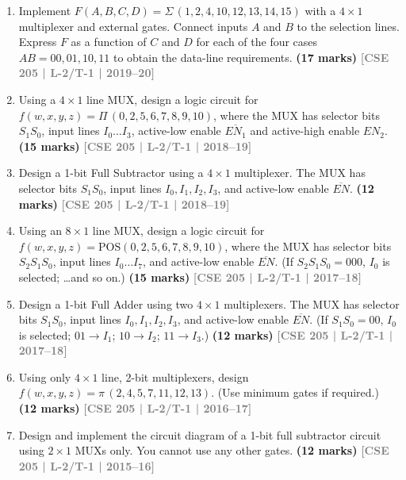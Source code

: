 \documentclass[12pt]{article}
\newcommand{\yr}[1]{\hfill\textcolor{gray}{\small\textbf{[#1]}}}
\newcommand{\mk}[1]{\textcolor{orange!70!black}{\small\textbf{(#1 marks)}}}
\begin{document}
\begin{enumerate}
\item Implement $F(A,B,C,D) = \Sigma\,(1,2,4,10,12,13,14,15)$ with a $4\times1$ multiplexer and external gates. Connect inputs $A$ and $B$ to the selection lines. Express $F$ as a function of $C$ and $D$ for each of the four cases $AB=00,01,10,11$ to obtain the data-line requirements.
\mk{17} \yr{CSE 205 | L-2/T-1 | 2019--20}



\item Using a $4\times1$ line MUX, design a logic circuit for $f(w,x,y,z) = \Pi\,(0,2,5,6,7,8,9,10)$, where the MUX has selector bits $S_1S_0$, input lines $I_0\ldots I_3$, active-low enable $\overline{EN_1}$ and active-high enable $EN_2$.
\mk{15} \yr{CSE 205 | L-2/T-1 | 2018--19}



\item Design a 1-bit Full Subtractor using a $4\times1$ multiplexer. The MUX has selector bits $S_1S_0$, input lines $I_0, I_1, I_2, I_3$, and active-low enable $\overline{EN}$.
\mk{12} \yr{CSE 205 | L-2/T-1 | 2018--19}



\item Using an $8\times1$ line MUX, design a logic circuit for $f(w,x,y,z) = \mathrm{POS}(0,2,5,6,7,8,9,10)$, where the MUX has selector bits $S_2S_1S_0$, input lines $I_0\ldots I_7$, and active-low enable $\overline{EN}$. (If $S_2S_1S_0 = 000$, $I_0$ is selected; \ldots and so on.)
\mk{15} \yr{CSE 205 | L-2/T-1 | 2017--18}



\item Design a 1-bit Full Adder using two $4\times1$ multiplexers. The MUX has selector bits $S_1S_0$, input lines $I_0, I_1, I_2, I_3$, and active-low enable $\overline{EN}$. (If $S_1S_0 = 00$, $I_0$ is selected; $01 \to I_1$; $10 \to I_2$; $11 \to I_3$.)
\mk{12} \yr{CSE 205 | L-2/T-1 | 2017--18}



\item Using only $4\times1$ line, 2-bit multiplexers, design $f(w,x,y,z) = \pi\,(2,4,5,7,11,12,13)$. (Use minimum gates if required.)
\mk{12} \yr{CSE 205 | L-2/T-1 | 2016--17}



\item Design and implement the circuit diagram of a 1-bit full subtractor circuit using $2\times1$ MUXs only. You cannot use any other gates.
\mk{12} \yr{CSE 205 | L-2/T-1 | 2015--16}




\end{enumerate}
\end{document}
